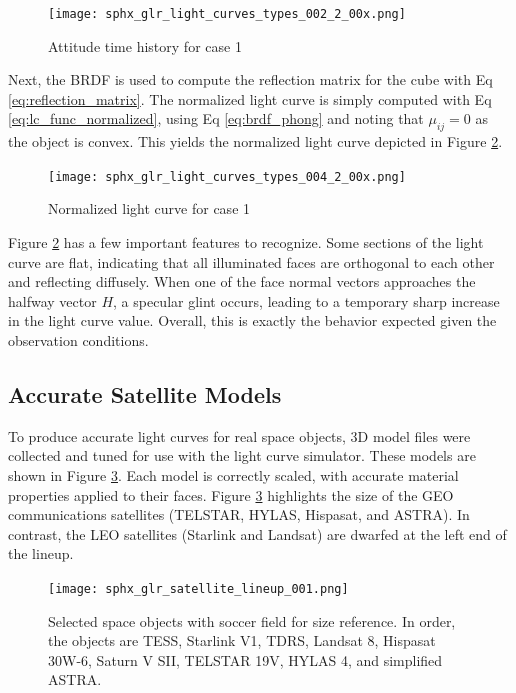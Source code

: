 \begin{figure}[!htb]
  \centering
  \texttt{[image: sphx\_glr\_light\_curves\_types\_002\_2\_00x.png]}
  \caption{Attitude time history for case 1}
  \label{fig:case1_attitude}
\end{figure}

Next, the BRDF is used to compute the reflection matrix for the cube with Eq \ref{eq:reflection_matrix}. The normalized light curve is simply computed with Eq \ref{eq:lc_func_normalized}, using Eq \ref{eq:brdf_phong} and noting that $\mu_{ij} = 0$ as the object is convex. This yields the normalized light curve depicted in Figure \ref{fig:case1_lc}.

\begin{figure}[!htb]
  \centering
  \texttt{[image: sphx\_glr\_light\_curves\_types\_004\_2\_00x.png]}
  \caption{Normalized light curve for case 1}
  \label{fig:case1_lc}
\end{figure}

Figure \ref{fig:case1_lc} has a few important features to recognize. Some sections of the light curve are flat, indicating that all illuminated faces are orthogonal to each other and reflecting diffusely. When one of the face normal vectors approaches the halfway vector $H$, a specular glint occurs, leading to a temporary sharp increase in the light curve value. Overall, this is exactly the behavior expected given the observation conditions.

\subsection{Accurate Satellite Models}

To produce accurate light curves for real space objects, 3D model files were collected and tuned for use with the light curve simulator. These models are shown in Figure \ref{fig:satellite_lineup}. Each model is correctly scaled, with accurate material properties applied to their faces. Figure \ref{fig:satellite_lineup} highlights the size of the GEO communications satellites (TELSTAR, HYLAS, Hispasat, and ASTRA). In contrast, the LEO satellites (Starlink and Landsat) are dwarfed at the left end of the lineup.

\begin{figure}[ht]
    \centering
    \texttt{[image: sphx\_glr\_satellite\_lineup\_001.png]}
    \caption{Selected space objects with soccer field for size reference. In order, the objects are TESS, Starlink V1, TDRS, Landsat 8, Hispasat 30W-6, Saturn V SII, TELSTAR 19V, HYLAS 4, and simplified ASTRA.
    }
    \label{fig:satellite_lineup}
\end{figure}

